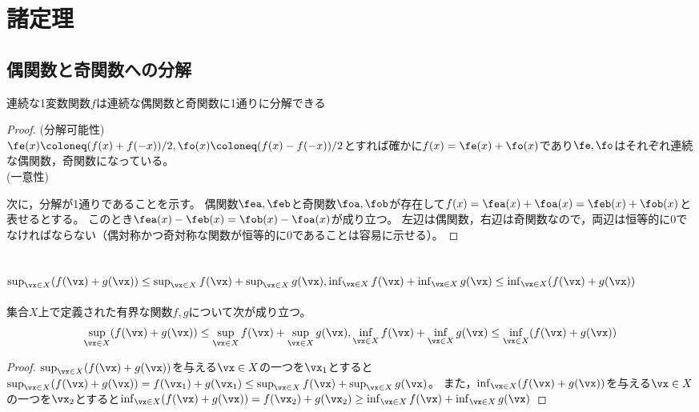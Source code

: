 \chapter{諸定理}
    \section{偶関数と奇関数への分解}
        \begin{shadebox}
            連続な1変数関数$f$は連続な偶関数と奇関数に1通りに分解できる
        \end{shadebox}
        \begin{proof}
            (分解可能性)\\
            $\fe(x) \coloneq (f(x)+f(-x))/2,\fo(x) \coloneq (f(x)-f(-x))/2$とすれば確かに$f(x)=\fe(x)+\fo(x)$であり$\fe,\fo$はそれぞれ連続な偶関数，奇関数になっている。\\
            \newline
            (一意性)
            \par
            次に，分解が1通りであることを示す。
            偶関数$\fea,\feb$と奇関数$\foa,\fob$が存在して$f(x) = \fea(x) + \foa(x) = \feb(x) + \fob(x)$と表せるとする。
            このとき$\fea(x) - \feb(x) = \fob(x) - \foa(x)$が成り立つ。
            左辺は偶関数，右辺は奇関数なので，両辺は恒等的に0でなければならない（偶対称かつ奇対称な関数が恒等的に0であることは容易に示せる）。
        \end{proof}
    \section{\texorpdfstring{$\sup_{\vx\in X}(f(\vx)+g(\vx)) \leq \sup_{\vx\in X}f(\vx) + \sup_{\vx\in X}g(\vx),\inf_{\vx\in X}f(\vx) + \inf_{\vx\in X}g(\vx) \leq \inf_{\vx\in X}(f(\vx)+g(\vx))$}{sup\_\{x∈X\} f(x)+g(x) ≤ sum\_\{x∈X\}f(x) + sup\_\{x∈X\}g(x), inf\_\{x∈X\}f(x) + inf\_\{x∈X\}g(x) ≤ inf\_\{x∈X\} f(x)+g(x)}}
        \begin{shadebox}
            集合$X$上で定義された有界な関数$f,g$について次が成り立つ。
            \[ \sup_{\vx\in X}(f(\vx)+g(\vx)) \leq \sup_{\vx\in X}f(\vx) + \sup_{\vx\in X}g(\vx),\inf_{\vx\in X}f(\vx) + \inf_{\vx\in X}g(\vx) \leq \inf_{\vx\in X}(f(\vx)+g(\vx)) \]
        \end{shadebox}
        \begin{proof}
            $\sup_{\vx\in X}(f(\vx)+g(\vx))$を与える$\vx\in X$の一つを$\vx_1$とすると$\sup_{\vx\in X}(f(\vx)+g(\vx)) = f(\vx_1)+g(\vx_1) \leq \sup_{\vx\in X}f(\vx) + \sup_{\vx\in X}g(\vx)$。
            また，$\inf_{\vx\in X}(f(\vx)+g(\vx))$を与える$\vx\in X$の一つを$\vx_2$とすると$\inf_{\vx\in X}(f(\vx)+g(\vx)) = f(\vx_2)+g(\vx_2) \geq \inf_{\vx\in X}f(\vx) + \inf_{\vx\in X}g(\vx)$
        \end{proof}
